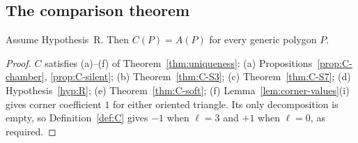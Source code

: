 \subsection{The comparison theorem}

\begin{theorem}[comparison]\label{thm:comparison}
Assume Hypothesis~R. Then $C(P)=A(P)$ for every generic polygon $P$.
\end{theorem}
\begin{proof}
$C$ satisfies (a)--(f) of Theorem~\ref{thm:uniqueness}: (a)
Propositions~\ref{prop:C-chamber}, \ref{prop:C-silent}; (b)
Theorem~\ref{thm:C-S3}; (c) Theorem~\ref{thm:C-S7}; (d) Hypothesis~\ref{hyp:R}; (e)
Theorem~\ref{thm:C-soft}; (f) Lemma~\ref{lem:corner-values}(i)
gives corner coefficient $1$ for either oriented triangle. Its only
decomposition is empty, so Definition~\ref{def:C} gives $-1$ when
$\ell=3$ and $+1$ when $\ell=0$, as required.
\end{proof}

